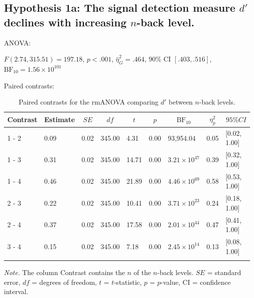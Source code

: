 \documentclass[
  man,floatsintext]{apa6}
\begin{document}
\newpage

\hypertarget{hypothesis-1a-the-signal-detection-measure-d-declines-with-increasing-n-back-level.}{%
\subsection{\texorpdfstring{Hypothesis 1a: The signal detection measure \(d'\) declines with increasing \(n\)-back level.}{Hypothesis 1a: The signal detection measure d\textquotesingle{} declines with increasing n-back level.}}\label{hypothesis-1a-the-signal-detection-measure-d-declines-with-increasing-n-back-level.}}

ANOVA:

\(F(2.74, 315.51) = 197.18\), \(p < .001\), \(\hat{\eta}^2_G = .464\), 90\% CI \([.403, .516]\), \(\mathrm{BF}_{\textrm{10}} = 1.56 \times 10^{101}\)

Paired contrasts:

\begin{table}[H]

\begin{center}
\begin{threeparttable}

\caption{\label{tab:unnamed-chunk-1}Paired contrasts for the rmANOVA comparing $d'$ between $n$-back levels.}

\begin{tabular}{lllllllll}
\toprule
Contrast & \multicolumn{1}{c}{Estimate} & \multicolumn{1}{c}{$SE$} & \multicolumn{1}{c}{$df$} & \multicolumn{1}{c}{$t$} & \multicolumn{1}{c}{$p$} & \multicolumn{1}{c}{$\mathrm{BF}_{\textrm{10}}$} & \multicolumn{1}{c}{$\eta_{p}^{2}$} & \multicolumn{1}{c}{$95\% CI$}\\
\midrule
1 - 2 & 0.09 & 0.02 & 345.00 & 4.31 & 0.00 & 93,954.04 & 0.05 & {}[0.02, 1.00]\\
1 - 3 & 0.31 & 0.02 & 345.00 & 14.71 & 0.00 & $3.21 \times 10^{47}$ & 0.39 & {}[0.32, 1.00]\\
1 - 4 & 0.46 & 0.02 & 345.00 & 21.89 & 0.00 & $4.46 \times 10^{69}$ & 0.58 & {}[0.53, 1.00]\\
2 - 3 & 0.22 & 0.02 & 345.00 & 10.41 & 0.00 & $3.71 \times 10^{23}$ & 0.24 & {}[0.18, 1.00]\\
2 - 4 & 0.37 & 0.02 & 345.00 & 17.58 & 0.00 & $2.01 \times 10^{44}$ & 0.47 & {}[0.41, 1.00]\\
3 - 4 & 0.15 & 0.02 & 345.00 & 7.18 & 0.00 & $2.45 \times 10^{14}$ & 0.13 & {}[0.08, 1.00]\\
\bottomrule
\addlinespace
\end{tabular}

\begin{tablenotes}[para]
\normalsize{\textit{Note.} The column Contrast contains the $n$ of the $n$-back levels. $SE$ = standard error, $df$ = degrees of freedom, $t$ = $t$-statistic, $p$ = $p$-value, CI = confidence interval.}
\end{tablenotes}

\end{threeparttable}
\end{center}

\end{table}
\end{document}
